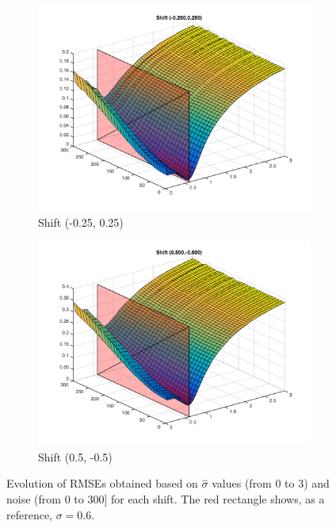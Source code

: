 \begin{figure}[!ht]
\begin{subfigure}{0.45\textwidth}
		\includegraphics[width=1\textwidth]{Results/ErrorByBlurAndNoiseForShift5}
		\caption{Shift (-0.25, 0.25)}
	\end{subfigure}	
	\begin{subfigure}{0.45\textwidth}
		\includegraphics[width=1\textwidth]{Results/ErrorByBlurAndNoiseForShift6}
		\caption{Shift (0.5, -0.5)}
	\end{subfigure}	
	\caption{Evolution of RMSEs obtained based on $\hat{\sigma}$ values (from 0 to 3) and noise (from $0$ to $300$] for each shift. The red rectangle shows, as a reference, $\sigma=0.6$. }
	\label{fig:RMSEPerBlurAndNoise}
\end{figure}

\clearpage

